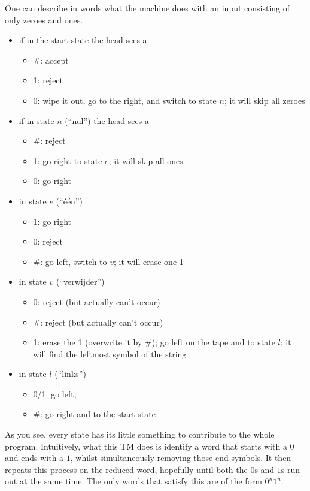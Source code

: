 One can describe in words what the machine does with an input
consisting of only zeroes and ones.

\begin{itemize}
\item if in the start state the head sees a
\begin{itemize}
\item \#: accept
\item 1: reject
\item 0: wipe it out, go to the right, and switch to state $n$; it
  will skip all zeroes
\end{itemize}

\item if in state $n$ (``nul'') the head sees a
\begin{itemize}
\item \#: reject
\item 1: go right to state $e$; it will skip all ones
\item 0: go right
\end{itemize}


\item in state $e$ (``één'')
\begin{itemize}
\item 1: go right
\item 0: reject
\item \#: go left, switch to $v$; it will erase one 1
\end{itemize}

\item in state $v$ (``verwijder'')
\begin{itemize}
\item 0: reject (but actually can't occur)
\item \#: reject (but actually can't occur)
\item 1: erase the 1 (overwrite it by \#); go left on the tape and to
  state $l$; it will find the leftmost symbol of the string
\end{itemize}

\item in state $l$ (``links'')
\begin{itemize}
\item 0/1: go left;
\item \#: go right and to the start state
\end{itemize}

\end{itemize}

As you see, every state has its little something to contribute to the
whole program. Intuitively, what this TM does is identify a word that starts with a $0$ and ends with a $1$, whilst simultaneously removing those end symbols. It then repeats this process on the reduced word, hopefully until both the $0$s and $1$s run out at the same time. The only words that satisfy this are of the form $0^n 1^n$.


